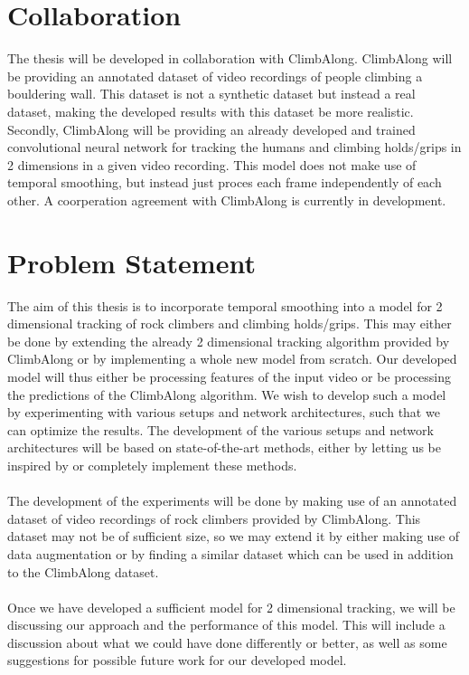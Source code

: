 \documentclass[11pt]{article}
\begin{document}
\section{Collaboration}
\label{sec:collab}
The thesis will be developed in collaboration with ClimbAlong. ClimbAlong will be providing an annotated dataset of video recordings of people climbing a bouldering wall. This dataset is not a synthetic dataset but instead a real dataset, making the developed results with this dataset be more realistic. Secondly, ClimbAlong will be providing an already developed and trained convolutional neural network for tracking the humans and climbing holds/grips in 2 dimensions in a given video recording. This model does not make use of temporal smoothing, but instead just proces each frame independently of each other. A coorperation agreement with ClimbAlong is currently in development.

\section{Problem Statement}
The aim of this thesis is to incorporate temporal smoothing into a model for 2 dimensional tracking of rock climbers and climbing holds/grips. This may either be done by extending the already 2 dimensional tracking algorithm provided by ClimbAlong or by implementing a whole new model from scratch. Our developed model will thus either be processing features of the input video or be processing the predictions of the ClimbAlong algorithm. We wish to develop such a model by experimenting with various setups and network architectures, such that we can optimize the results. The development of the various setups and network architectures will be based on state-of-the-art methods, either by letting us be inspired by or completely implement these methods.
\\
\\
The development of the experiments will be done by making use of an annotated dataset of video recordings of rock climbers provided by ClimbAlong. This dataset may not be of sufficient size, so we may extend it by either making use of data augmentation or by finding a similar dataset which can be used in addition to the ClimbAlong dataset. 
\\
\\
Once we have developed a sufficient model for 2 dimensional tracking, we will be discussing our approach and the performance of this model. This will include a discussion about what we could have done differently or better, as well as some suggestions for possible future work for our developed model. 
\end{document}
